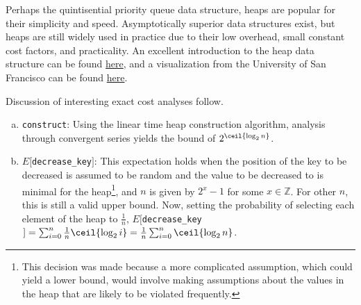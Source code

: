 Perhaps the quintisential priority queue data structure, heaps are popular for their simplicity and speed.  Asymptotically superior data structures exist, but heaps are still widely used in practice due to their low overhead, small constant cost factors, and practicality.  An excellent introduction to the heap data structure can be found \href{http://www.cprogramming.com/tutorial/computersciencetheory/heap.html}{here}, and a visualization from the University of San Francisco can be found \href{http://www.cs.usfca.edu/~galles/visualization/Heap.html}{here}.

Discussion of interesting exact cost analyses follow.

\begin{enumerate}[a):]

\item \texttt{construct}: Using the linear time heap construction algorithm, analysis through convergent series yields the bound of $2^{\ceil{\log_2 n}}$.

\item $E[$\texttt{decrease\_key}$]$: This expectation holds when the position of the key to be decreased is assumed to be random and the value to be decreased to is minimal for the heap\footnote{This decision was made because a more complicated assumption, which could yield a lower bound, would involve making assumptions about the values in the heap that are likely to be violated frequently.}, and $n$ is given by $2^x - 1$ for some $x \in \mathbb{Z}$.  For other $n$, this is still a valid upper bound.  Now, setting the probability of selecting each element of the heap to $\frac{1}{n}$, $E[$\texttt{decrease\_key}$] = \sum_{i = 0}^n \frac{1}{n} \ceil{\log_2 i} = \frac{1}{n} \sum_{i = 0}^n \ceil{\log_2 n}$.

\end{enumerate}
